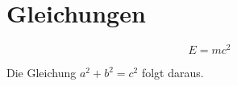 \documentclass{scrartcl}
\begin{document}
\section*{Gleichungen}

\begin{equation}
E=mc^2
\end{equation}%

%
%
%

Die Gleichung  $a^2+b^2=c^2$ 
 folgt daraus.

\printnomenclature
\end{document}
